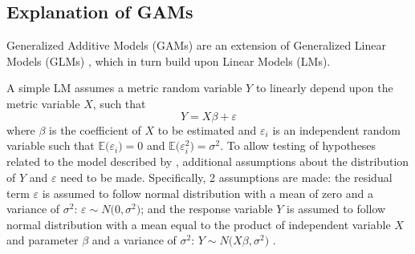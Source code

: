 \subsection{Explanation of GAMs}

Generalized Additive Models (GAMs) \parencite{Wood2006,Hastie1991} are an extension of Generalized Linear Models (GLMs) \parencite{Nelder1972}, which in turn build upon Linear Models (LMs).


A simple LM assumes a metric random variable \(Y\) to linearly depend upon the metric variable \(X\), such that
\begin{equation}
  \label{eq:LinearModel}
  Y = X \beta + \varepsilon
\end{equation}
where \(\beta\) is the coefficient of \(X\) to be estimated and \(\varepsilon_i\) is an independent random variable such that \(\mathbb{E}\bigl(\varepsilon_i\bigr) = 0\) and \(\mathbb{E}\bigl(\varepsilon_i^2\bigr) = \sigma^2\).  To allow testing of hypotheses related to the model described by , additional assumptions about the distribution of \(Y\) and \(\varepsilon\) need to be made.  Specifically, 2 assumptions are made: the residual term \(\varepsilon\) is assumed to follow normal distribution with a mean of zero and a variance of \(\sigma^2\): \(\varepsilon \sim N\bigl(0, \sigma^2\bigr)\); and the response variable \(Y\) is assumed to follow normal distribution with a mean equal to the product of independent variable \(X\) and parameter \(\beta\) and a variance of \(\sigma^2\): \(Y \sim N\bigl(X \beta, \sigma^2\bigr) \) \parencite{Wood2006,Burkschat2012}.


